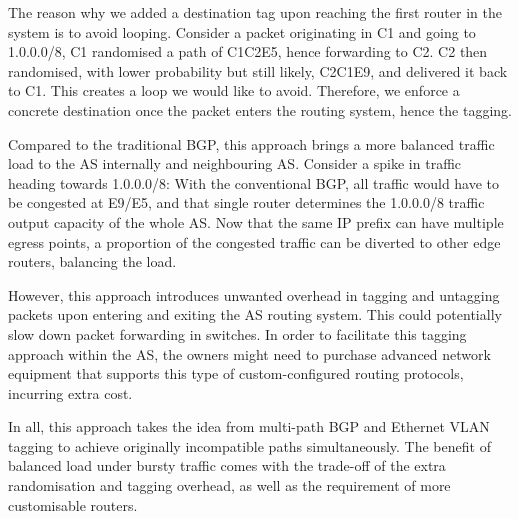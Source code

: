 \documentclass[12pt]{article}
\begin{document}
The reason why we added a destination tag upon reaching the first router in the system is to avoid looping. Consider a packet originating in C1 and going to 1.0.0.0/8, C1 randomised a path of C1\textrightarrow{}C2\textrightarrow{}E5, hence forwarding to C2. C2 then randomised, with lower probability but still likely, C2\textrightarrow{}C1\textrightarrow{}E9, and delivered it back to C1. This creates a loop we would like to avoid. Therefore, we enforce a concrete destination once the packet enters the routing system, hence the tagging.

Compared to the traditional BGP, this approach brings a more balanced traffic load to the AS internally and neighbouring AS. Consider a spike in traffic heading towards 1.0.0.0/8: With the conventional BGP, all traffic would have to be congested at E9/E5, and that single router determines the 1.0.0.0/8 traffic output capacity of the whole AS. Now that the same IP prefix can have multiple egress points, a proportion of the congested traffic can be diverted to other edge routers, balancing the load.

However, this approach introduces unwanted overhead in tagging and untagging packets upon entering and exiting the AS routing system. This could potentially slow down packet forwarding in switches. In order to facilitate this tagging approach within the AS, the owners might need to purchase advanced network equipment that supports this type of custom-configured routing protocols, incurring extra cost.

In all, this approach takes the idea from multi-path BGP and Ethernet VLAN tagging to achieve originally incompatible paths simultaneously. The benefit of balanced load under bursty traffic comes with the trade-off of the extra randomisation and tagging overhead, as well as the requirement of more customisable routers.
\end{document}
